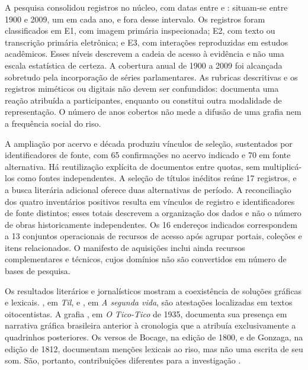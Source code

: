 A pesquisa consolidou \CorpusSize{} registros no núcleo, com datas entre \CoreMinYear{} e \CoreMaxYear{}: \CoreWithin{} situam-se entre 1900 e 2009, um em cada ano, e \CoreOutside{} fora desse intervalo. Os registros foram classificados em \CoreEOne{} E1, com imagem primária inspecionada; \CoreETwo{} E2, com texto ou transcrição primária eletrônica; e \CoreEThree{} E3, com interações reproduzidas em estudos acadêmicos. Esses níveis descrevem a cadeia de acesso à evidência e não uma escala estatística de certeza. A cobertura anual de 1900 a 2009 foi alcançada sobretudo pela incorporação de séries parlamentares. As \CoreRubrics{} rubricas descritivas e os \CoreMimetic{} registros miméticos ou digitais não devem ser confundidos:  documenta uma reação atribuída a participantes, enquanto  ou  constitui outra modalidade de representação. O número de anos cobertos não mede a difusão de uma grafia nem a frequência social do riso.

A ampliação por acervo e década produziu \ArchiveLinkCount{} vínculos de seleção, sustentados por \ArchiveSourceCount{} identificadores de fonte, com 65 confirmações no acervo indicado e 70 em fonte alternativa. Há reutilização explícita de documentos entre quotas, sem multiplicá-los como fontes independentes. A seleção de títulos inéditos reúne 17 registros, e a busca literária adicional oferece duas alternativas de período. A reconciliação dos quatro inventários positivos resulta em \EvidenceMemberships{} vínculos de registro e \EvidenceSources{} identificadores de fonte distintos; esses totais descrevem a organização dos dados e não o número de obras historicamente independentes. Os 16 endereços indicados correspondem a 13 conjuntos operacionais de recursos de acesso após agrupar portais, coleções e itens relacionados. O manifesto de aquisições inclui ainda recursos complementares e técnicos, cujos domínios não são convertidos em número de bases de pesquisa.

Os resultados literários e jornalísticos mostram a coexistência de soluções gráficas e lexicais. , em \textit{Til}, e , em \textit{A segunda vida}, são atestações localizadas em textos oitocentistas. A grafia , em \textit{O Tico-Tico} de 1935, documenta sua presença em narrativa gráfica brasileira anterior à cronologia que a atribuía exclusivamente a quadrinhos posteriores. Os versos de Bocage, na edição de 1800, e de Gonzaga, na edição de 1812, documentam menções lexicais ao riso, mas não uma escrita de seu som. São, portanto, contribuições diferentes para a investigação \cite{alencar1872,assis1884,ticotico1935,altBocage1800,altGonzaga1812}.


